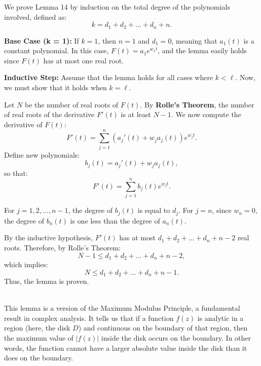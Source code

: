 \documentclass{article}
\newenvironment{proofbox}
  {\begin{mdframed}[linewidth=1pt,linecolor=black,backgroundcolor=white]\noindent\ignorespaces}
  {\end{mdframed}}
\begin{document}
\begin{proofbox}

We prove Lemma 14 by induction on the total degree of the polynomials involved, defined as:
\[
k = d_1 + d_2 + \dots + d_n + n.
\]

\textbf{Base Case (k = 1):} If $k = 1$, then $n = 1$ and $d_1 = 0$, meaning that $a_1(t)$ is a constant polynomial. In this case, $F(t) = a_1 e^{w_1 t}$, and the lemma easily holds since $F(t)$ has at most one real root.

\textbf{Inductive Step:} Assume that the lemma holds for all cases where $k < \ell$. Now, we must show that it holds when $k = \ell$.

Let $N$ be the number of real roots of $F(t)$. By \textbf{Rolle's Theorem}, the number of real roots of the derivative $F'(t)$ is at least $N - 1$. We now compute the derivative of $F(t)$:
\[
F'(t) = \sum_{j=1}^n \left( a_j'(t) + w_j a_j(t) \right) e^{w_j t}.
\]
Define new polynomials:
\[
b_j(t) = a_j'(t) + w_j a_j(t),
\]
so that:
\[
F'(t) = \sum_{j=1}^n b_j(t) e^{w_j t}.
\]

For $j = 1, 2, \dots, n-1$, the degree of $b_j(t)$ is equal to $d_j$. For $j = n$, since $w_n = 0$, the degree of $b_n(t)$ is one less than the degree of $a_n(t)$.

By the inductive hypothesis, $F'(t)$ has at most $d_1 + d_2 + \dots + d_n + n - 2$ real roots. Therefore, by Rolle's Theorem:
\[
N - 1 \leq d_1 + d_2 + \dots + d_n + n - 2,
\]
which implies:
\[
N \leq d_1 + d_2 + \dots + d_n + n - 1.
\]
Thus, the lemma is proven.\\\\
    
\end{proofbox}



This lemma is a version of the Maximum Modulus Principle, a fundamental result in complex analysis. It tells us that if a function \( f(z) \) is analytic in a region (here, the disk \( D \)) and continuous on the boundary of that region, then the maximum value of \( |f(z)| \) inside the disk occurs on the boundary. In other words, the function cannot have a larger absolute value inside the disk than it does on the boundary.
\end{document}
